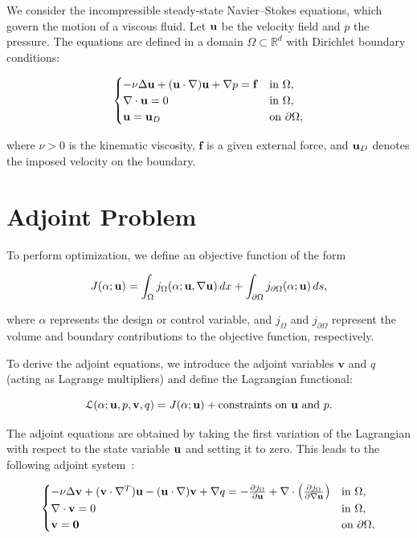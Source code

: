 We consider the incompressible steady-state Navier–Stokes equations, which govern the motion of a viscous fluid. Let $\b_u$ be the velocity field and $p$ the pressure. The equations are defined in a domain $\Omega \subset \mathbb{R}^d$ with Dirichlet boundary conditions:

\begin{equation}
\begin{cases}
- \nu \Delta \b_u + (\b_u \cdot \nabla) \b_u + \nabla p = \mathbf{f} & \text{in } \Omega, \\
\nabla \cdot \b_u = 0 & \text{in } \Omega, \\
\b_u = \b_u_D & \text{on } \partial \Omega,
\end{cases}
\label{state}
\end{equation}

where $\nu > 0$ is the kinematic viscosity, $\mathbf{f}$ is a given external force, and $\b_u_D$ denotes the imposed velocity on the boundary.


\section{Adjoint Problem}

To perform optimization, we define an objective function of the form

\begin{equation}
J(\alpha; \b_u) = \int_{\Omega} j_{\Omega}(\alpha; \b_u, \nabla \b_u)\, dx + \int_{\partial\Omega} j_{\partial\Omega}(\alpha; \b_u)\, ds,
\end{equation}

where $\alpha$ represents the design or control variable, and $j_{\Omega}$ and $j_{\partial\Omega}$ represent the volume and boundary contributions to the objective function, respectively.

To derive the adjoint equations, we introduce the adjoint variables $\mathbf{v}$ and $q$ (acting as Lagrange multipliers) and define the Lagrangian functional:

\[
\mathcal{L}(\alpha; \b_u, p, \mathbf{v}, q) = J(\alpha; \b_u) + \text{constraints on } \b_u \text{ and } p.
\]

The adjoint equations are obtained by taking the first variation of the Lagrangian with respect to the state variable $\b_u$ and setting it to zero. This leads to the following adjoint system~\cite{galecki2022adjoint}:

\begin{equation}
\begin{cases}
- \nu \Delta \mathbf{v} + (\mathbf{v}  \cdot \nabla^T) \b_u - (\b_u \cdot \nabla) \mathbf{v} + \nabla q = - \frac{\partial j_{\Omega}}{\partial \b_u} + \nabla \cdot \left( \frac{\partial j_{\Omega}}{\partial \nabla \b_u} \right) & \text{in } \Omega, \\
\nabla \cdot \mathbf{v} = 0 & \text{in } \Omega, \\
\mathbf{v} = \mathbf{0} & \text{on } \partial \Omega,
\end{cases}
\label{adjoint}
\end{equation}

